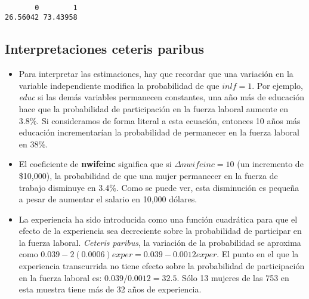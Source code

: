 \documentclass[
  letterpaper,
  DIV=11,
  numbers=noendperiod]{scrreprt}
\newenvironment{Shaded}{\begin{snugshade}}{\end{snugshade}}
\newcommand{\DecValTok}[1]{\textcolor[rgb]{0.68,0.00,0.00}{#1}}
\newcommand{\FloatTok}[1]{\textcolor[rgb]{0.68,0.00,0.00}{#1}}
\newcommand{\FunctionTok}[1]{\textcolor[rgb]{0.28,0.35,0.67}{#1}}
\newcommand{\NormalTok}[1]{\textcolor[rgb]{0.00,0.23,0.31}{#1}}
\newcommand{\OtherTok}[1]{\textcolor[rgb]{0.00,0.23,0.31}{#1}}
\newcommand{\SpecialCharTok}[1]{\textcolor[rgb]{0.37,0.37,0.37}{#1}}
\begin{document}
\begin{verbatim}

       0        1 
26.56042 73.43958 
\end{verbatim}

\subsection{Interpretaciones ceteris
paribus}\label{interpretaciones-ceteris-paribus}

\begin{itemize}
\item
  Para interpretar las estimaciones, hay que recordar que una variación
  en la variable independiente modifica la probabilidad de que
  \(inlf=1\). Por ejemplo, \emph{educ} si las demás variables permanecen
  constantes, una año más de educación hace que la probabilidad de
  participación en la fuerza laboral aumente en 3.8\%. Si consideramos
  de forma literal a esta ecuación, entonces 10 años más educación
  incrementarían la probabilidad de permanecer en la fuerza laboral en
  38\%.
\item
  El coeficiente de \textbf{nwifeinc} significa que si
  \(\Delta nwifeinc=10\) (un incremento de \$10,000), la probabilidad de
  que una mujer permanecer en la fuerza de trabajo disminuye en 3.4\%.
  Como se puede ver, esta disminución es pequeña a pesar de aumentar el
  salario en 10,000 dólares.
\item
  La experiencia ha sido introducida como una función cuadrática para
  que el efecto de la experiencia sea decreciente sobre la probabilidad
  de participar en la fuerza laboral. \emph{Ceteris paribus}, la
  variación de la probabilidad se aproxima como
  \(0.039-2(0.0006)exper=0.039-0.0012exper\). El punto en el que la
  experiencia transcurrida no tiene efecto sobre la probabilidad de
  participación en la fuerza laboral es: \(0.039/0.0012=32.5\). Sólo 13
  mujeres de las 753 en esta muestra tiene más de 32 años de
  experiencia.
\end{itemize}

\begin{Shaded}
\end{Shaded}
\end{document}

